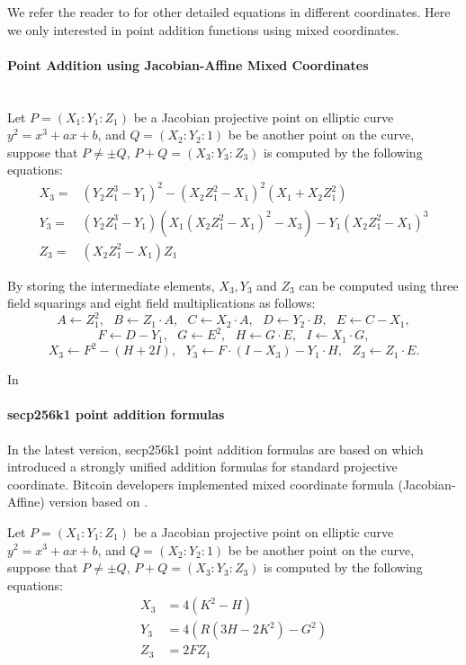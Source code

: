 We refer the reader to \cite{hankerson2006guide,brown2001software} for other detailed equations in different coordinates. Here we only interested in point addition functions using mixed coordinates. 

\paragraph{Point Addition using Jacobian-Affine Mixed Coordinates} \mbox{} \\
Let $P = (X_1:Y_1:Z_1)$ be a Jacobian projective point on elliptic curve $y^2=x^3+ax+b$, and $Q = (X_2:Y_2:1)$ be be another point on the curve, suppose that $P \neq \pm Q$, $P+Q=(X_3:Y_3:Z_3)$ is computed by the following equations:
\begin{equation} \label{eq:8m3s}
\begin{split}
X_3 = &(Y_2Z_1^3-Y_1)^2 - (X_2Z_1^2-X_1)^2(X_1+X_2Z_1^2) \\
Y_3 = &(Y_2Z_1^3-Y_1)(X_1(X_2Z_1^2-X_1)^2-X_3)-Y_1(X_2Z_1^2-X_1)^3 \\
Z_3 = &(X_2Z_1^2-X_1)Z_1 
\end{split}
\end{equation}

By storing the intermediate elements, $X_3,Y_3$ and $Z_3$ can be computed using three field squarings and eight field multiplications as follows:
$$ A \leftarrow Z_1^2, \text{ } B \leftarrow Z_1 \cdot A,  \text{ } C \leftarrow X_2 \cdot A,  \text{ } D \leftarrow Y_2 \cdot B,  \text{ }  E \leftarrow C - X_1,$$
$$ F \leftarrow D - Y_1, \text{ } G \leftarrow E^2, \text{ } H \leftarrow G \cdot E, \text{ } I \leftarrow X_1 \cdot G, $$
$$ X_3 \leftarrow F^2 - (H+2I), \text{ } Y_3 \leftarrow F \cdot (I - X_3) - Y_1 \cdot H, \text{ } Z_3 \leftarrow Z_1 \cdot E.$$

In \cite{bernstein2007explicit} 

\paragraph{secp256k1 point addition formulas}
In the latest version, secp256k1 point addition formulas are based on \cite{brier2002weierstrass} which introduced a strongly unified addition formulas for standard projective coordinate. Bitcoin developers implemented mixed coordinate formula (Jacobian-Affine) version based on \cite{brier2002weierstrass}. 

Let $P = (X_1:Y_1:Z_1)$ be a Jacobian projective point on elliptic curve $y^2=x^3+ax+b$, and $Q = (X_2:Y_2:1)$ be be another point on the curve, suppose that $P \neq \pm Q$, $P+Q=(X_3:Y_3:Z_3)$ is computed by the following equations:
\begin{equation} \label{eq:7m5s}
\begin{split}
X_3 &= 4 (K^2 - H) \\
Y_3 &= 4 (R(3H-2K^2)-G^2) \\
Z_3 &= 2 F  Z_1
\end{split}
\end{equation}

